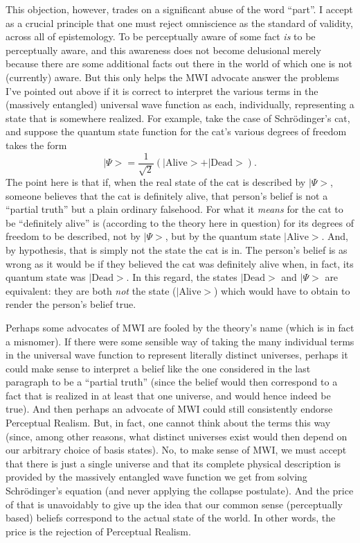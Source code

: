 \documentclass[12pt]{article}
\begin{document}
This objection, however, trades on 
a significant abuse of the word ``part''.  I accept as
a crucial principle that one must reject omniscience as the standard
of validity, across all of epistemology.
To be perceptually aware of
some fact \emph{is} to be perceptually aware, and this awareness does not
become delusional merely because there are some additional facts out
there in the world of which one is not (currently) aware.  But this 
only helps the MWI advocate answer the problems I've pointed out above
if it is correct to interpret the various terms in the (massively 
entangled) universal wave function as each,  individually,
representing a state that is somewhere realized.  For example, take
the case of Schr\"odinger's cat, and suppose the quantum state 
function for the cat's various degrees of freedom takes the form
\begin{equation}
|\Psi \! > = \frac{1}{\sqrt{2}} \left( |{\mathrm{Alive}}\!> +
 |{\mathrm{Dead}}\!> \right).
\end{equation}
The point here is that if, when the real state of the cat is 
described by $|\Psi\!>$, someone believes that the cat is definitely
alive, that person's belief is not a ``partial truth'' but a plain
ordinary falsehood.  For what it \emph{means} for the cat to be
``definitely alive'' is (according to the theory here in question)
for its degrees of freedom to be described, not by $|\Psi\!>$, but
by the quantum state $|{\mathrm{Alive}}\!>$.  And, by hypothesis,
that is simply not the state the cat is in.  The person's belief is as
wrong as it would be if they believed the cat was definitely alive
when, in fact, its quantum state was $|{\mathrm{Dead}}\!>$.  In this
regard, the states $|{\mathrm{Dead}}\!>$ and $|\Psi\!>$ are equivalent:
they are both \emph{not} the state ($|{\mathrm{Alive}}\!>$) which
would have to obtain to render the person's belief true.

Perhaps some advocates of MWI are fooled by the theory's name
(which is in fact a misnomer).  If there were some sensible  way of taking
the many individual terms in the universal wave function to represent
literally distinct universes, perhaps it could make sense to interpret
a belief like the one considered in the last paragraph to be a
``partial truth'' (since the belief would then correspond to a fact
that is realized in at least that one universe, and would hence indeed 
be true).  And then perhaps
an advocate of MWI could still consistently endorse Perceptual Realism.
But, in fact, one cannot think about the terms this way (since, among
other reasons, what distinct universes exist would then depend on our
arbitrary choice of basis states).  No, to make sense of MWI, we must
accept that there is just a single universe and that its complete
physical description is provided by the massively entangled wave
function we get from solving Schr\"odinger's equation (and never
applying the collapse postulate).  And the price of that is
unavoidably to give up the idea that our common sense (perceptually
based) beliefs correspond to the actual state of the world.  In other
words, the price is the rejection of Perceptual Realism.
\end{document}
